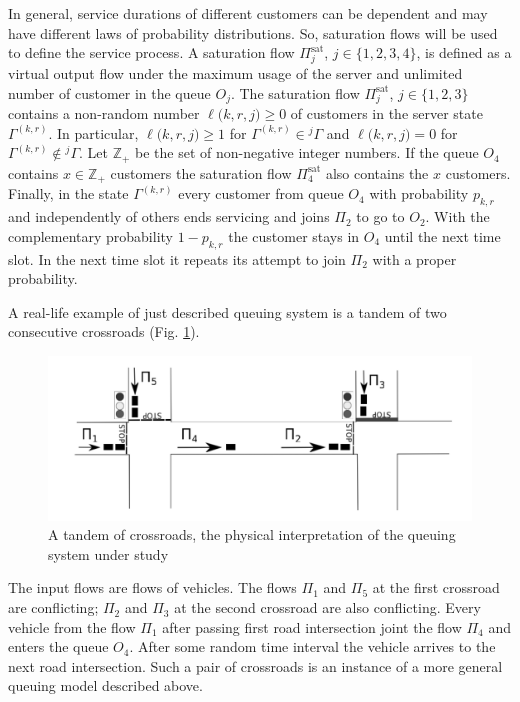 \documentclass[runningheads,a4paper]{llncs}
\begin{document}
In general, service durations of different customers can be dependent and may have different laws of
probability distributions. So, saturation flows will be used to define the service process. A
saturation flow $\Pi^{\mathrm{\text{sat}}}_j$, $j \in \{1,2,3,4\}$, is defined as a virtual output
flow under the maximum usage of the server and unlimited number of customer in the queue $O_j$. The
saturation flow $\Pi^{\mathrm{\text{sat}}}_j$, $j\in \{1,2,3\}$ contains a non-random number
$\ell({k,r,j)}\geqslant0$ of customers in the server state $\Gamma^{(k,r)}$. In particular,
$\ell({k,r,j)}\geqslant1$ for $\Gamma^{(k,r)}\in{}^j\Gamma$ and $\ell({k,r,j)}=0$ for
$\Gamma^{(k,r)}\not\in{}^j\Gamma$. Let $\mathbb{Z}_+$ be
the set of non-negative integer numbers. If the queue $O_4$ contains $x \in \mathbb{Z}_+$ customers
the saturation flow $\Pi^{\mathrm{\text{sat}}}_4$ also contains the $x$ customers.  Finally, in the
state $\Gamma^{(k,r)}$ every customer from queue $O_4$ with probability $p_{k,r}$ and independently
of others ends servicing and joins $\Pi_2$ to go to $O_2$. With the complementary probability
$1-p_{k,r}$ the customer stays in $O_4$ until the next time slot. In the next time slot it repeats
its attempt to join $\Pi_2$ with a proper probability.

A real-life example of just described queuing system is a tandem of two consecutive crossroads
(Fig. \ref{crossroads}).
\begin{figure}[h!]
   \centering
    \includegraphics[width=\textwidth]{Crossroads.pdf} 
    \caption {A tandem of crossroads, the physical interpretation of the queuing system under study}
    \label{crossroads}
\end{figure}
The input flows are flows of vehicles. The flows $\Pi_1$ and $\Pi_5$ at the first crossroad are
conflicting; $\Pi_2$ and $\Pi_3$ at the second crossroad are also conflicting. Every vehicle from
the flow $\Pi_1$ after passing first road intersection joint the flow $\Pi_4$ and enters the queue
$O_4$. After some random time interval the vehicle arrives to the next road intersection. Such a pair
of crossroads is an instance of a more general queuing model described above.
\end{document}
